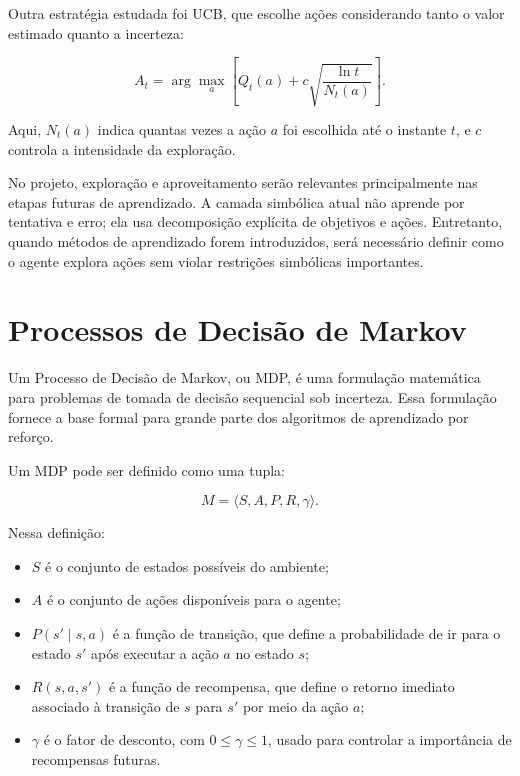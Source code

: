 Outra estratégia estudada foi UCB, que escolhe ações considerando tanto o
valor estimado quanto a incerteza:

\begin{equation}
A_t =
\arg\max_a
\left[
Q_t(a) + c\sqrt{\frac{\ln t}{N_t(a)}}
\right].
\end{equation}

Aqui, $N_t(a)$ indica quantas vezes a ação $a$ foi escolhida até o instante
$t$, e $c$ controla a intensidade da exploração.

No projeto, exploração e aproveitamento serão relevantes principalmente nas
etapas futuras de aprendizado.
A camada simbólica atual não aprende por tentativa e erro; ela usa
decomposição explícita de objetivos e ações.
Entretanto, quando métodos de aprendizado forem introduzidos, será necessário
definir como o agente explora ações sem violar restrições simbólicas
importantes.

\section{Processos de Decisão de Markov}

Um Processo de Decisão de Markov, ou MDP, é uma formulação matemática para
problemas de tomada de decisão sequencial sob incerteza.
Essa formulação fornece a base formal para grande parte dos algoritmos de
aprendizado por reforço.

Um MDP pode ser definido como uma tupla:

\begin{equation}
M = \langle S, A, P, R, \gamma \rangle.
\end{equation}

Nessa definição:

\begin{itemize}
\item $S$ é o conjunto de estados possíveis do ambiente;
\item $A$ é o conjunto de ações disponíveis para o agente;
\item $P(s' \mid s,a)$ é a função de transição, que define a probabilidade de ir para o estado $s'$ após executar a ação $a$ no estado $s$;
\item $R(s,a,s')$ é a função de recompensa, que define o retorno imediato associado à transição de $s$ para $s'$ por meio da ação $a$;
\item $\gamma$ é o fator de desconto, com $0 \leq \gamma \leq 1$, usado para controlar a importância de recompensas futuras.
\end{itemize}

